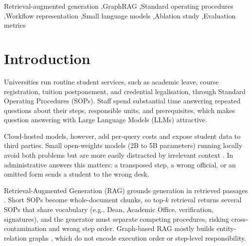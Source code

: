 \documentclass[preprint,10pt]{elsarticle}
\begin{document}
\begin{frontmatter}
\begin{abstract}
\textbf{Conclusions:} Procedure-level selection is the primary driver of factual recall in concise procedural corpora, while workflow graphs provide chronological formatting integrity and token efficiency.
\end{abstract}

\begin{keyword}
Retrieval-augmented generation \sep GraphRAG \sep Standard operating procedures \sep Workflow representation \sep Small language models \sep Ablation study \sep Evaluation metrics
\end{keyword}

\end{frontmatter}

\par

\section{Introduction}
\label{sec:intro}

Universities run routine student services, such as academic leave, course registration, tuition postponement, and credential legalisation, through Standard Operating Procedures (SOPs). Staff spend substantial time answering repeated questions about their steps, responsible units, and prerequisites, which makes question answering with Large Language Models (LLMs) attractive.

Cloud-hosted models, however, add per-query costs and expose student data to third parties. Small open-weights models (2B to 5B parameters) running locally avoid both problems but are more easily distracted by irrelevant context \cite{liu2024lost}. In administrative answers this matters: a transposed step, a wrong official, or an omitted form sends a student to the wrong desk.

Retrieval-Augmented Generation (RAG) grounds generation in retrieved passages \cite{lewis2020rag,gao2023ragsurvey}. Short SOPs become whole-document chunks, so top-$k$ retrieval returns several SOPs that share vocabulary (e.g., Dean, Academic Office, verification, signatures), and the generator must separate competing procedures, risking cross-contamination and wrong step order. Graph-based RAG \cite{peng2024graphragsurvey,pan2024unifying} mostly builds entity-relation graphs \cite{edge2024graphrag,guo2024lightrag,gutierrez2024hipporag}, which do not encode execution order or step-level responsibility.
\end{document}
